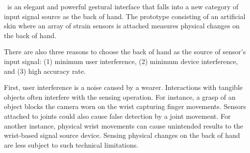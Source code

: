 \documentclass{sigchi}
\begin{document}







 
 

\getTitleName\ is an elegant and powerful gestural interface that falls into a new category of input signal source as the back of hand. The prototype consisting of an artificial skin where an array of strain sensors is attached measures physical changes on the back of hand.


There are also three reasons to choose the back of hand as the source of sensor's input signal: (1) minimum user interference, (2) minimum device interference, and (3) high accuracy rate. 

First, user interference is a noise caused by a wearer. Interactions with tangible objects often interfere with the sensing operation.
For instance, a grasp of an object blocks the camera worn on the wrist capturing finger movements.
Sensors attached to joints could also cause false detection by a joint movement.
For another instance, physical wrist movements can cause unintended results to the wrist-based signal source device. Sensing physical changes on the back of hand are less subject to such technical limitations. 
\end{document}
